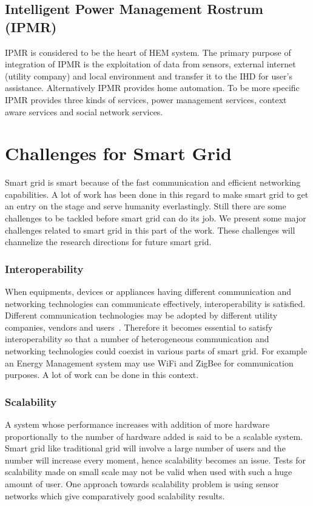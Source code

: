\documentclass[journal]{IEEEtran}
\begin{document}
\subsection{Intelligent Power Management Rostrum (IPMR)}
IPMR is considered to be the heart of HEM system. The primary purpose of integration of IPMR is the exploitation of data from sensors, external internet (utility company) and local environment and transfer it to the IHD for user's assistance. Alternatively IPMR provides home automation. To be more specific IPMR provides three kinds of services, power management services, context aware services and social network services.\\
\section{Challenges for Smart Grid}
Smart grid is smart because of the fast communication and efficient networking capabilities. A lot of work has been done in this regard to make smart grid to get an entry on the stage and serve humanity everlastingly. Still there are some challenges to be tackled before smart grid can do its job. We present some major challenges related to smart grid in this part of the work. These challenges will channelize the research directions for future smart grid.\\
\subsubsection{Interoperability}
When equipments, devices or appliances having different communication and networking technologies can communicate effectively, interoperability is satisfied. Different communication technologies may be adopted by different utility companies, vendors and users~\cite{kailas2012survey}. Therefore it becomes essential to satisfy interoperability so that a number of heterogeneous communication and networking technologies could coexist in various parts of smart grid. For example an Energy Management system may use WiFi and ZigBee for communication purposes. A lot of work can be done in this context.\\
\subsubsection{Scalability}
A system whose performance increases with addition of more hardware proportionally to the number of hardware added is said to be a scalable system. Smart grid like traditional grid will involve a large number of users and the number will increase every moment, hence scalability becomes an issue. Tests for scalability made on small scale may not be valid when used with such a huge amount of user. One approach towards scalability problem is using sensor networks which give comparatively good scalability results.\\
\end{document}

